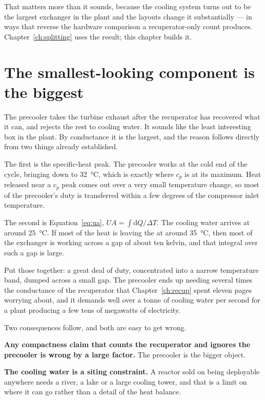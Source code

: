 \documentclass[11pt,a4paper]{report}
\begin{document}
That matters more than it sounds, because the cooling system turns out to be
the largest exchanger in the plant and the layouts change it substantially
--- in ways that reverse the hardware comparison a recuperator-only count
produces. Chapter~\ref{ch:splitting} uses the result; this chapter builds it.

\section{The smallest-looking component is the biggest}
\label{sec:biggest}

The precooler takes the turbine exhaust after the recuperator has recovered
what it can, and rejects the rest to cooling water. It sounds like the least
interesting box in the plant. By conductance it is the largest, and the
reason follows directly from two things already established.

The first is the specific-heat peak. The precooler works at the cold end of
the cycle, bringing  down to \SI{32}{\celsius}, which is exactly
where $c_p$ is at its maximum. Heat released near a $c_p$ peak comes out
over a very small temperature change, so most of the precooler's duty is
transferred within a few degrees of the compressor inlet temperature.

The second is Equation~\eqref{eq:ua}, $UA = \int \mathrm{d}Q / \Delta T$.
The cooling water arrives at around \SI{25}{\celsius}. If most of the heat
is leaving the  at around \SI{35}{\celsius}, then most of the
exchanger is working across a gap of about ten kelvin, and that integral
over such a gap is large.

Put those together: a great deal of duty, concentrated into a narrow
temperature band, dumped across a small gap. The precooler ends up needing
several times the conductance of the recuperator that
Chapter~\ref{ch:recup} spent eleven pages worrying about, and it demands
well over a tonne of cooling water per second for a plant producing a few
tens of megawatts of electricity.

Two consequences follow, and both are easy to get wrong.

\textbf{Any compactness claim that counts the recuperator and ignores the
precooler is wrong by a large factor.} The precooler is the bigger object.

\textbf{The cooling water is a siting constraint.} A reactor sold on being
deployable anywhere needs a river, a lake or a large cooling tower, and that
is a limit on where it can go rather than a detail of the heat balance.
\end{document}
